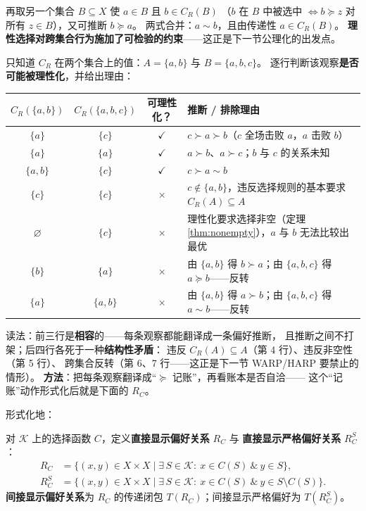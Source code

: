 再取另一个集合 $B\subseteq X$ 使 $a\in B$ 且 $b\in C_R(B)$
（$b$ 在 $B$ 中被选中 $\iff b\succeq z$ 对所有 $z\in B$），又可推断 $b\succeq a$。
两式合并：$a\sim b$，且由传递性 $a\in C_R(B)$。
\textbf{理性选择对跨集合行为施加了可检验的约束}——这正是下一节公理化的出发点。

\begin{example}\label{ex:judgetable}
只知道 $C_R$ 在两个集合上的值：$A=\{a,b\}$ 与 $B=\{a,b,c\}$。
逐行判断该观察\textbf{是否可能被理性化}，并给出理由：
\begin{center}
\small
\begin{tabular}{cccp{5.6cm}}
\toprule
$C_R(\{a,b\})$ & $C_R(\{a,b,c\})$ & 可理性化？ & 推断 / 排除理由 \\
\midrule
$\{a\}$ & $\{c\}$ & $\checkmark$ & $c\succ a\succ b$（$c$ 全场击败 $a$，$a$ 击败 $b$） \\
$\{a\}$ & $\{a\}$ & $\checkmark$ & $a\succ b$、$a\succ c$；$b$ 与 $c$ 的关系未知 \\
$\{a,b\}$ & $\{c\}$ & $\checkmark$ & $c\succ a\sim b$ \\
$\{c\}$ & $\{c\}$ & $\times$ & $c\notin\{a,b\}$，违反选择规则的基本要求 $C_R(A)\subseteq A$ \\
$\varnothing$ & $\{c\}$ & $\times$ & 理性化要求选择非空（定理 \ref{thm:nonempty}），$a$ 与 $b$ 无法比较出最优 \\
$\{b\}$ & $\{a\}$ & $\times$ & 由 $\{a,b\}$ 得 $b\succ a$；由 $\{a,b,c\}$ 得 $a\succeq b$——反转 \\
$\{a\}$ & $\{a,b\}$ & $\times$ & 由 $\{a,b\}$ 得 $a\succ b$；由 $\{a,b,c\}$ 得 $a\sim b$——反转 \\
\bottomrule
\end{tabular}
\end{center}
读法：前三行是\textbf{相容}的——每条观察都能翻译成一条偏好推断，
且推断之间不打架；后四行各死于一种\textbf{结构性矛盾}：
违反 $C_R(A)\subseteq A$（第 4 行）、违反非空性（第 5 行）、
跨集合反转（第 6、7 行——这正是下一节 WARP/HARP 要禁止的情形）。
\textbf{方法}：把每条观察翻译成“$\succeq$ 记账”，再看账本是否自洽——
这个“记账”动作形式化后就是下面的 $R_C$。
\end{example}

形式化地：

\begin{definition}[直接与间接显示偏好关系]\label{def:RC}
对 $\mathcal{K}$ 上的选择函数 $C$，定义\textbf{直接显示偏好关系} $R_C$ 与
\textbf{直接显示严格偏好关系} $R_C^S$：
\begin{align}
R_C &= \{(x,y)\in X\times X \mid \exists\, S\in\mathcal{K}:\ x\in C(S)\ \&\ y\in S\},\\
R_C^S &= \{(x,y)\in X\times X \mid \exists\, S\in\mathcal{K}:\ x\in C(S)\ \&\ y\in S\setminus C(S)\}.
\end{align}
\textbf{间接显示偏好关系}为 $R_C$ 的传递闭包 $T(R_C)$；间接显示严格偏好为 $T(R_C^S)$。
\end{definition}

